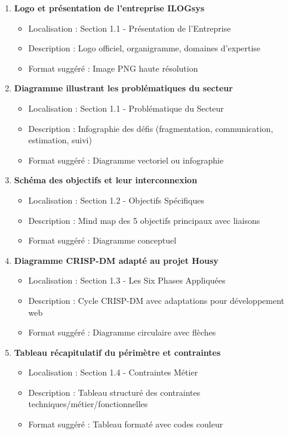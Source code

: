 \begin{enumerate}
    \item \textbf{Logo et présentation de l'entreprise ILOGsys}
    \begin{itemize}
        \item Localisation : Section 1.1 - Présentation de l'Entreprise
        \item Description : Logo officiel, organigramme, domaines d'expertise
        \item Format suggéré : Image PNG haute résolution
    \end{itemize}
    
    \item \textbf{Diagramme illustrant les problématiques du secteur}
    \begin{itemize}
        \item Localisation : Section 1.1 - Problématique du Secteur
        \item Description : Infographie des défis (fragmentation, communication, estimation, suivi)
        \item Format suggéré : Diagramme vectoriel ou infographie
    \end{itemize}
    
    \item \textbf{Schéma des objectifs et leur interconnexion}
    \begin{itemize}
        \item Localisation : Section 1.2 - Objectifs Spécifiques
        \item Description : Mind map des 5 objectifs principaux avec liaisons
        \item Format suggéré : Diagramme conceptuel
    \end{itemize}
    
    \item \textbf{Diagramme CRISP-DM adapté au projet Housy}
    \begin{itemize}
        \item Localisation : Section 1.3 - Les Six Phases Appliquées
        \item Description : Cycle CRISP-DM avec adaptations pour développement web
        \item Format suggéré : Diagramme circulaire avec flèches
    \end{itemize}
    
    \item \textbf{Tableau récapitulatif du périmètre et contraintes}
    \begin{itemize}
        \item Localisation : Section 1.4 - Contraintes Métier
        \item Description : Tableau structuré des contraintes techniques/métier/fonctionnelles
        \item Format suggéré : Tableau formaté avec codes couleur
    \end{itemize}
\end{enumerate}

